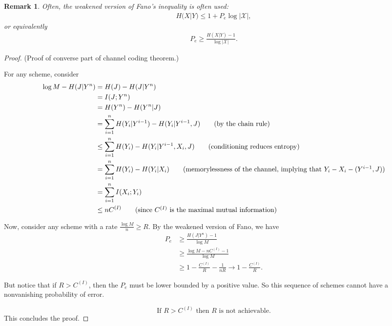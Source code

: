 \documentclass[13pt]{article}
\newtheorem*{remark}{Remark}
\newcommand{\bx}{\boxed}
\newcommand{\T}{\text}
\def\XX{\mathcal{X}}
\begin{document}
\begin{remark}
  Often, the weakened version of Fano's inequality is often used:
\begin{align*}
  H(X|Y) \leq 1 + P_e \log |\XX|,
\end{align*}
or equivalently
\begin{align*}
  P_e \geq \frac{H(X|Y) -1}{\log |\XX|}.
\end{align*}
\end{remark}


\begin{proof} (Proof of converse part of channel coding theorem.)

  For any scheme, consider
  \begin{align*}
    \log M - H(J | Y^n) &= H(J) - H(J | Y^n) \\
    &= I(J; Y^n) \\
    &= H(Y^n) - H(Y^n | J) \\
    &= \sum_{i=1}^{n} H(Y_i | Y^{i-1}) - H(Y_i | Y^{i-1}, J) \tag{by the chain rule}  \\
    & \leq \sum_{i=1}^{n} H(Y_i) - H(Y_i | Y^{i-1}, X_i, J) \tag{conditioning reduces entropy} \\
    &= \sum_{i=1}^{n} H(Y_i) - H(Y_i | X_i) \tag{memorylessness of the channel, implying that $Y_i - X_i - (Y^{i-1}, J)$}\\
    &= \sum_{i=1}^{n} I(X_i; Y_i) \\
    & \leq n C^{(I)} \tag{since $C^{(I)}$ is the maximal mutual information}
  \end{align*}

  Now, consider any scheme with a rate $\frac{\log M}{n}  \geq R$.  By the weakened version of Fano, we have
  \begin{align*}
    P_e &\geq \frac{H(J | Y^n) - 1}{\log M} \\
    & \geq \frac{\log M - n C^{(I)} - 1}{\log M} \\
    & \geq 1 - \frac{C^{(I)}}{R} - \frac{1}{nR} \to 1 - \frac{C^{(I)}}{R} \tag{as $n \to \infty$}.
  \end{align*}

  But notice that if $R > C^{(I)}$, then the $P_e$ must be lower bounded by a positive value.  So this sequence of schemes cannot have a nonvanishing probability of error.

  \[
    \bx{\T{If $R > C^{(I)}$ then $R$ is not achievable.}}
  \]
  This concludes the proof.
\end{proof}
\end{document}
